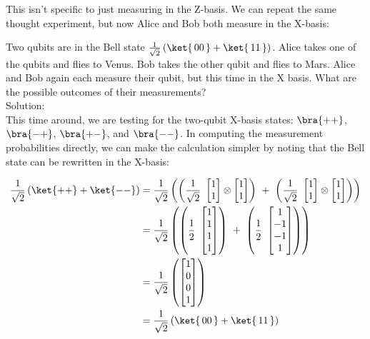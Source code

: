 \documentclass{article}
\newcommand{\soln}{{\\[1em] \hspace{-1em}\color{greentitle}\sffamily\large Solution: \\[0.5em]}}
\theoremstyle{definition}
\newcommand{\kz}[1]{\ket{\,#1\,}}
\newcommand{\kx}[1]{\ket{#1}}
\newcommand{\bx}[1]{\bra{#1}}
\begin{document}
This isn't specific to just measuring in the Z-basis.  We can repeat the same thought experiment, but now Alice and Bob both measure in the X-basis:
\begin{example}
	Two qubits are in the Bell state $\frac{1}{\sqrt{2}} \left(\kz{00} + \kz{11}\right)$.  Alice takes one of the qubits and flies to Venus.  Bob takes the other qubit and flies to Mars.  Alice and Bob again each measure their qubit, but this time in the X basis.  What are the possible outcomes of their measurements?
	\soln \textnormal{This time around, we are testing for the two-qubit X-basis states: $\bx{++}$, $\bx{-+}$, $\bx{+-}$, and $\bx{--}$.  In computing the measurement probabilities directly, we can make the calculation simpler by noting that the Bell state can be rewritten in the X-basis:}

	\begin{align}
		\frac{1}{\sqrt{2}} \left(\kx{++} + \kx{--}\right) &= \frac{1}{\sqrt{2}} \left(\left(\frac{1}{\sqrt{2}} \ \begin{bmatrix}
			1\\ 1
		\end{bmatrix} \otimes \begin{bmatrix}
			1\\ 1
		\end{bmatrix}\right) \ + \ \left(\frac{1}{\sqrt{2}} \ \begin{bmatrix}
			1\\ 1
		\end{bmatrix} \otimes \begin{bmatrix}
			1\\ 1
		\end{bmatrix}\right)\right)\\
		&= \frac{1}{\sqrt{2}} \left(\left(\frac{1}{2} \ \begin{bmatrix}
			1\\ 1\\ 1\\ 1\end{bmatrix}\right) \ + \ \left(\frac{1}{2} \ \begin{bmatrix}
				1\\ -1\\ -1\\ 1\end{bmatrix}\right)\right)\\
		&= \frac{1}{\sqrt{2}} \left(\begin{bmatrix}
			1\\ 0\\ 0\\ 1
		\end{bmatrix}\right)\\
		&= \frac{1}{\sqrt{2}} \left(\kz{00} + \kz{11}\right)
	\end{align}


\end{example}
\end{document}
